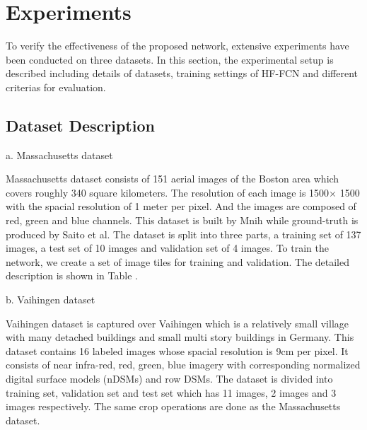 \section{Experiments}
\label{Sec:exp}
To verify the effectiveness of the proposed network, extensive experiments have been conducted on three datasets. In this section, the experimental setup is described including details of datasets, training settings of HF-FCN and different criterias for evaluation.
\subsection{Dataset Description}
a. Massachusetts dataset\par
\setlength{\parindent}{4ex}Massachusetts dataset consists of 151 aerial images of the Boston area which covers roughly 340 square kilometers. The resolution of each image is 1500$\times$ 1500 with the spacial resolution of 1 meter per pixel. And the images are composed of red, green and blue channels. This dataset is built by Mnih while ground-truth is produced by Saito et al. The dataset is split into three parts,  a training set of 137 images, a test set of 10 images and validation set of 4 images. To train the network, we create a set of image tiles for training and validation. The detailed description is shown in Table .\par

\setlength{\parindent}{2ex}b. Vaihingen dataset\par
\setlength{\parindent}{4ex}Vaihingen dataset is captured over Vaihingen which is a relatively small village with many detached buildings and small multi story buildings in Germany. This dataset contains 16 labeled images whose spacial resolution is 9cm per pixel. It consists of near infra-red, red, green, blue imagery with corresponding normalized digital surface models (nDSMs) and row DSMs. The dataset is divided into training set, validation set and test set which has 11 images, 2 images and 3 images respectively. The same crop operations are done as the Massachusetts dataset.\par

